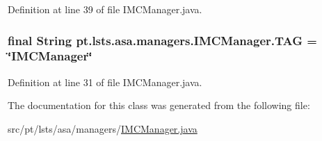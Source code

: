 Definition at line 39 of file I\+M\+C\+Manager.\+java.

\hypertarget{classpt_1_1lsts_1_1asa_1_1managers_1_1IMCManager_a9a8d383d7c827d376dacda2ad575a359}{}
\subsubsection[{T\+A\+G}]{\setlength{\rightskip}{0pt plus 5cm}final String pt.\+lsts.\+asa.\+managers.\+I\+M\+C\+Manager.\+T\+A\+G = \char`\"{}I\+M\+C\+Manager\char`\"{}\hspace{0.3cm}{\ttfamily [static]}}\label{classpt_1_1lsts_1_1asa_1_1managers_1_1IMCManager_a9a8d383d7c827d376dacda2ad575a359}


Definition at line 31 of file I\+M\+C\+Manager.\+java.



The documentation for this class was generated from the following file\+:\begin{DoxyCompactItemize}
\item 
src/pt/lsts/asa/managers/\hyperlink{IMCManager_8java}{I\+M\+C\+Manager.\+java}\end{DoxyCompactItemize}
